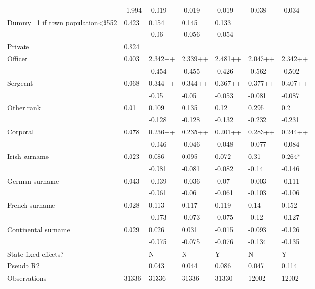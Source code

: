\documentclass[draft.tex]{subfiles}
\begin{document}
\begin{table}
\begin{tabular}{lllllll}
                                                 & -1.994  & -0.019  & -0.019  & -0.019  & -0.038                              & -0.034 \\
Dummy=1 if town population<9552                  & 0.423   & 0.154   & 0.145   & 0.133   &                                     &  \\
                                                 &         & -0.06   & -0.056  & -0.054  &                                     &  \\
Private                                          & 0.824   &         &         &         &                                     &  \\
Officer & 0.003 & 2.342++ & 2.339++ & 2.481++ & 2.043++ & 2.342++ \\
        &       & -0.454  & -0.455  & -0.426  & -0.562  & -0.502  \\
Sergeant             & 0.068 & 0.344++ & 0.344++ & 0.367++ & 0.377++ & 0.407++ \\
                     &       & -0.05   & -0.05   & -0.053  & -0.081  & -0.087  \\
Other rank           & 0.01  & 0.109   & 0.135   & 0.12    & 0.295   & 0.2     \\
                     &       & -0.128  & -0.128  & -0.132  & -0.232  & -0.231  \\
Corporal             & 0.078 & 0.236++ & 0.235++ & 0.201++ & 0.283++ & 0.244++ \\
                     &       & -0.046  & -0.046  & -0.048  & -0.077  & -0.084  \\
Irish surname        & 0.023 & 0.086   & 0.095   & 0.072   & 0.31    & 0.264*  \\
                     &       & -0.081  & -0.081  & -0.082  & -0.14   & -0.146  \\
German surname       & 0.043 & -0.039  & -0.036  & -0.07   & -0.003  & -0.111  \\
                     &       & -0.061  & -0.06   & -0.061  & -0.103  & -0.106  \\
French surname       & 0.028 & 0.113   & 0.117   & 0.119   & 0.14    & 0.152   \\
                     &       & -0.073  & -0.073  & -0.075  & -0.12   & -0.127  \\
Continental surname  & 0.029 & 0.026   & 0.031   & -0.015  & -0.093  & -0.126  \\
                     &       & -0.075  & -0.075  & -0.076  & -0.134  & -0.135  \\
State fixed effects? &       & N       & N       & Y       & N       & Y       \\
Pseudo R2            &       & 0.043   & 0.044   & 0.086   & 0.047   & 0.114   \\
Observations         & 31336 & 31336   & 31336   & 31330   & 12002   & 12002   \\
\end{tabular}
\end{table}
\end{document}
